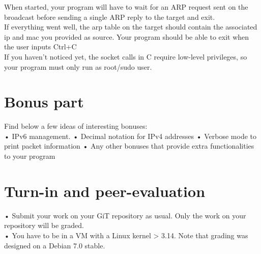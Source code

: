 \documentclass{42-en}
\begin{document}
    When started, your program will have to wait for an ARP request sent on the broadcast before sending a single ARP reply to the target and exit.\\
    If everything went well, the arp table on the target should contain the associated ip and mac you provided as source.
    Your program should be able to exit when the user inputs Ctrl+C\\

    If you haven't noticed yet, the socket calls in C require low-level privileges, so your program must only run as root/sudo user.


\chapter{Bonus part}

 Find below a few ideas of interesting bonuses:\\
 
    • IPv6 management.
    • Decimal notation for IPv4 addresses
    • Verbose mode to print packet information
    • Any other bonuses that provide extra functionalities to your program


\chapter{Turn-in and peer-evaluation}

        • Submit your work on your GiT repository as usual. Only the work on your repository will be graded.\\
        \newline
        • You have to be in a VM with a Linux kernel > 3.14. Note that grading was designed on a Debian 7.0 stable.



\end{document}
